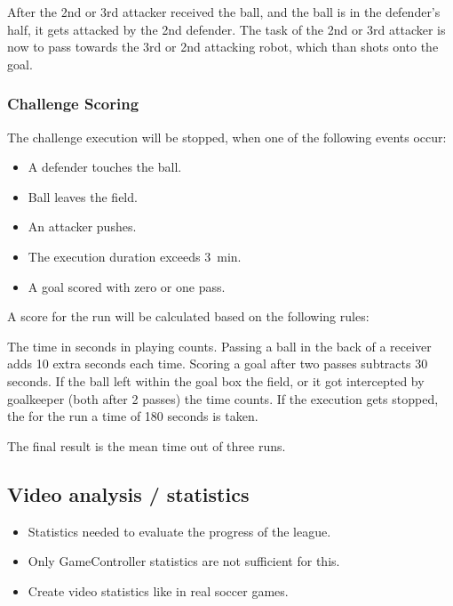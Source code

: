     After the 2nd or 3rd attacker received the ball, and the ball is in the defender's half, it gets attacked by the 2nd defender. The task of the 2nd or 3rd attacker is now to pass towards the 3rd or 2nd attacking robot, which than shots onto the goal.

    \subsubsection{Challenge Scoring}

    The challenge execution will be stopped, when one of the following events occur:

    \begin{itemize}
        \item A defender touches the ball.
        \item Ball leaves the field.
        \item An attacker pushes.
        \item The execution duration exceeds \qty{3}{\minute}.
        \item A goal scored with zero or one pass.
    \end{itemize}

    A score for the run will be calculated based on the following rules:

    The time in seconds in playing counts. Passing a ball in the back of a receiver adds 10 extra seconds each time. Scoring a goal after two passes subtracts 30 seconds.
    If the ball left within the goal box the field, or it got intercepted by goalkeeper (both after 2 passes) the time counts.
    If the execution gets stopped, the for the run a time of 180 seconds is taken.

    The final result is the mean time out of three runs.

\subsection{Video analysis / statistics}
\begin{itemize}
    \item Statistics needed to evaluate the progress of the league.
    \item Only GameController statistics are not sufficient for this.
    \item Create video statistics like in real soccer games.
\end{itemize}

